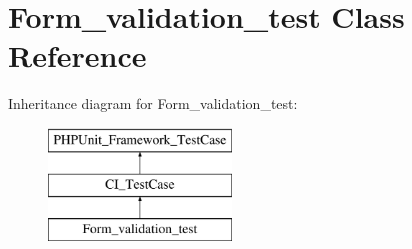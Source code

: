 \hypertarget{class_form__validation__test}{}\section{Form\+\_\+validation\+\_\+test Class Reference}
\label{class_form__validation__test}
Inheritance diagram for Form\+\_\+validation\+\_\+test\+:\begin{figure}[H]
\begin{center}
\leavevmode
\includegraphics[height=3.000000cm]{class_form__validation__test}
\end{center}
\end{figure}
